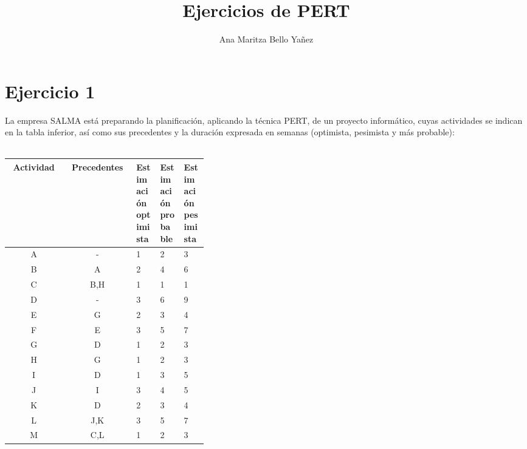\documentclass[12pt]{article}
\begin{document}
\title{Ejercicios de PERT}
\author{Ana Maritza Bello Yañez}
\maketitle


\section{Ejercicio 1}
La empresa SALMA está preparando la planificación, aplicando la técnica PERT, de
un proyecto informático, cuyas actividades se indican en la tabla inferior, así
como sus precedentes y la duración expresada en semanas (optimista, pesimista y
más probable):  \\
\\

\begin{center}
\begin{tabular}{ccp{0.125\linewidth}p{0.125\linewidth}p{0.125\linewidth}}
Actividad &   Precedentes   &   Estimación optimista    &   Estimación probable
&   Estimación pesimista \\
\hline
A   &    -   &   1   &   2   &   3   \\
B   &    A   &   2   &   4   &   6   \\
C   &   B,H  &   1   &   1   &   1   \\
D   &    -   &   3   &   6   &   9   \\
E   &    G   &   2   &   3   &   4   \\
F   &    E   &   3   &   5   &   7   \\
G   &    D   &   1   &   2   &   3   \\
H   &    G   &   1   &   2   &   3   \\
I   &    D   &   1   &   3   &   5   \\
J   &    I   &   3   &   4   &   5   \\
K   &    D   &   2   &   3   &   4   \\
L   &   J,K  &   3   &   5   &   7   \\
M   &   C,L  &   1   &   2   &   3   \\
\end{tabular}
\end{center}
\end{document}
